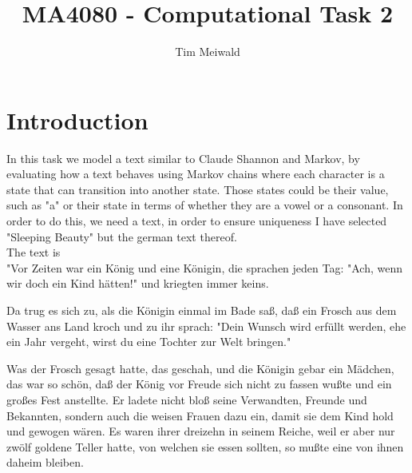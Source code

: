 \documentclass[11pt,a4paper]{CLabBookTemplate} %
\author{Tim Meiwald}
\title{MA4080 - Computational Task 2 } %
\begin{document}
\setcounter{page}{1} %

\maketitle %




\thispagestyle{fancy} %
\mytableofcontents
\newpage %


\setcounter{page}{1} %

\section{Introduction}
In this task we model a text similar to Claude Shannon and Markov, by evaluating how a text behaves using Markov chains where each character is a state that can transition into another state. Those states could be their value, such as "a" or their state in terms of whether they are a vowel or a consonant. In order to do this, we need a text, in order to ensure uniqueness I have selected "Sleeping Beauty" but the german text thereof. \\

The text is \\

"Vor Zeiten war ein König und eine Königin, die sprachen jeden Tag: "Ach, wenn wir doch ein Kind hätten!" und kriegten immer keins.

Da trug es sich zu, als die Königin einmal im Bade saß, daß ein Frosch aus dem Wasser ans Land kroch und zu ihr sprach: "Dein Wunsch wird erfüllt werden, ehe ein Jahr vergeht, wirst du eine Tochter zur Welt bringen."

Was der Frosch gesagt hatte, das geschah, und die Königin gebar ein Mädchen, das war so schön, daß der König vor Freude sich nicht zu fassen wußte und ein großes Fest anstellte. Er ladete nicht bloß seine Verwandten, Freunde und Bekannten, sondern auch die weisen Frauen dazu ein, damit sie dem Kind hold und gewogen wären. Es waren ihrer dreizehn in seinem Reiche, weil er aber nur zwölf goldene Teller hatte, von welchen sie essen sollten, so mußte eine von ihnen daheim bleiben.
\end{document}
